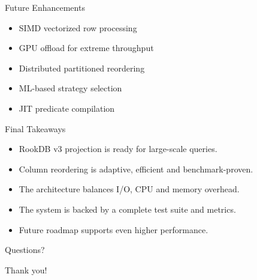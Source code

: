 \documentclass{beamer}
\begin{document}
\begin{frame}{Future Enhancements}
  \begin{itemize}
    \item SIMD vectorized row processing
    \item GPU offload for extreme throughput
    \item Distributed partitioned reordering
    \item ML-based strategy selection
    \item JIT predicate compilation
  \end{itemize}
\end{frame}

\begin{frame}{Final Takeaways}
  \begin{itemize}
    \item RookDB v3 projection is ready for large-scale queries.
    \item Column reordering is adaptive, efficient and benchmark-proven.
    \item The architecture balances I/O, CPU and memory overhead.
    \item The system is backed by a complete test suite and metrics.
    \item Future roadmap supports even higher performance.
  \end{itemize}
\end{frame}

\begin{frame}{Questions?}
  \begin{center}
    \huge Thank you!
  \end{center}
\end{frame}
\end{document}

